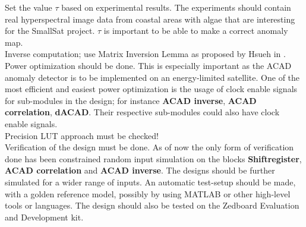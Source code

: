 Set the value $\tau$ based on experimental results. The experiments should contain real hyperspectral image data from coastal areas with algae that are interesting for the SmallSat project. $\tau$ is important to be able to make a correct anomaly map. \\

Inverse computation; use Matrix Inversion Lemma as proposed by Hsueh in \cite{hsueh_master_thesis}.\\

Power optimization should be done. This is especially important as the ACAD anomaly detector is to be implemented on an energy-limited satellite. One of the most efficient and easiest power optimization is the usage of clock enable signals for sub-modules in the design; for instance \textbf{ACAD inverse}, \textbf{ACAD correlation}, \textbf{dACAD}. Their respective sub-modules could also have clock enable signals.\\

Precision LUT approach must be checked!\\

Verification of the design must be done. As of now the only form of verification done has been constrained random input simulation on the blocks \textbf{Shiftregister}, \textbf{ACAD correlation} and \textbf{ACAD inverse}. The designs should be further simulated for a wider range of inputs. An automatic test-setup should be made, with a golden reference model, possibly by using MATLAB or other high-level tools or languages. The design should also be tested on the Zedboard Evaluation and Development kit. 
